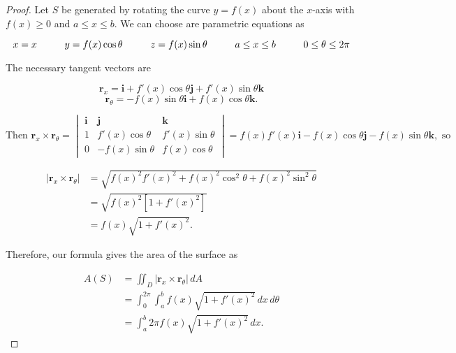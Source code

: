\documentclass[11pt,oneside,english]{amsart}
\theoremstyle{definition}
\newcommand{\pspace}{\hspace{10mm}}
\begin{document}
\begin{proof}
Let $S$ be generated by rotating the curve $y=f(x)$ about the $x$-axis with $f(x)\geq 0$ and $a\leq x\leq b$. We can choose are parametric equations as


\[
x=x\pspace y=f(x)\cos\theta\pspace z=f(x)\sin\theta\pspace a\leq x\leq b\pspace 0\leq \theta\leq 2\pi
\]

The necessary tangent vectors are 

\[
\mathbf{r}_x=\mathbf{i}+f'(x)\cos\theta\mathbf{j}+f'(x)\sin\theta\mathbf{k}
\]
\[
\mathbf{r}_\theta=-f(x)\sin\theta\mathbf{i}+f(x)\cos\theta\mathbf{k}.
\]



\[
\text{Then }\mathbf{r}_x\times\mathbf{r}_\theta=\begin{vmatrix}\mathbf{i}&\mathbf{j}&\mathbf{k}\\ 1 & f'(x)\cos\theta & f'(x)\sin\theta\\ 0 & -f(x)\sin\theta & f(x)\cos\theta\end{vmatrix}=f(x)f'(x)\mathbf{i}-f(x)\cos\theta\mathbf{j}-f(x)\sin\theta\mathbf{k},\text{ so}
\]

\begin{align*}
|\mathbf{r}_x\times\mathbf{r}_\theta|&=\sqrt{f(x)^2f'(x)^2+f(x)^2\cos^2\theta+f(x)^2\sin^2\theta}\\[2mm]
&=\sqrt{f(x)^2[1+f'(x)^2]}\\[2mm]
&=f(x)\sqrt{1+f'(x)^2}.
\end{align*}

Therefore, our formula gives the area of the surface as

\begin{align*}
A(S)&=\iint_D|\mathbf{r}_x\times\mathbf{r}_\theta|\,dA\\[2mm]
&=\int_0^{2\pi}\int_a^bf(x)\sqrt{1+f'(x)^2}\,dx\,d\theta\\[2mm]
&=\int_a^b2\pi f(x)\sqrt{1+f'(x)^2}\,dx.
\end{align*}
\end{proof}
\end{document}
